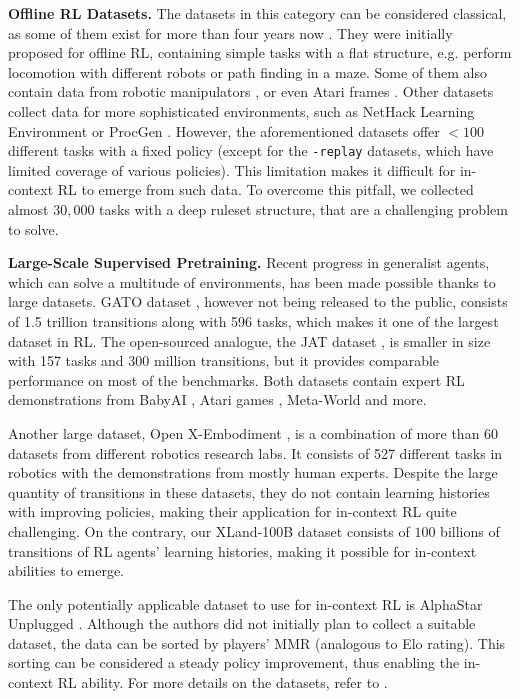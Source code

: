 \documentclass{article}
\begin{document}
\textbf{Offline RL Datasets.}
The datasets in this category can be considered classical, as some of them exist for more than four years now \citep{fu2020d4rl}. They were initially proposed for offline RL, containing simple tasks with a flat structure, e.g. perform locomotion with different robots \citep{lu2023challenges} or path finding in a maze. Some of them also contain data from robotic manipulators \citep{fu2020d4rl, rafailov2023d5rl}, or even Atari frames \citep{gulcehre2021rl}. Other datasets collect data for more sophisticated environments, such as NetHack Learning Environment \citep{hambro2023dungeons, kurenkov2024katakomba} or ProcGen \citep{cobbe2019procgen, mediratta2024generalization}. However, the aforementioned datasets offer $<100$ different tasks with a fixed policy (except for the \texttt{-replay} datasets, which have limited coverage of various policies). This limitation makes it difficult for in-context RL to emerge from such data. To overcome this pitfall, we collected almost $30,000$ tasks with a deep ruleset structure, that are a challenging problem to solve.

\textbf{Large-Scale Supervised Pretraining.}
Recent progress in generalist agents, which can solve a multitude of environments, has been made possible thanks to large datasets. GATO dataset \citep{reed2022generalist}, however not being released to the public, consists of 1.5 trillion transitions along with 596 tasks, which makes it one of the largest dataset in RL. The open-sourced analogue, the JAT dataset \citep{gallouedec2024jack}, is smaller in size with 157 tasks and 300 million transitions, but it provides comparable performance on most of the benchmarks. Both datasets contain expert RL demonstrations from BabyAI \citep{hui2020babyai}, Atari games \citep{bellemare13arcade}, Meta-World \citep{yu2020meta} and more. 

Another large dataset, Open X-Embodiment \citep{padalkar2023open}, is a combination of more than 60 datasets from different robotics research labs. It consists of 527 different tasks in robotics with the demonstrations from mostly human experts. Despite the large quantity of transitions in these datasets, they do not contain learning histories with improving policies, making their application for in-context RL quite challenging. On the contrary, our XLand-100B dataset consists of $100$ billions of transitions of RL agents' learning histories, making it possible for in-context abilities to emerge.

The only potentially applicable dataset to use for in-context RL is AlphaStar Unplugged \citep{mathieu2023alphastar}. Although the authors did not initially plan to collect a suitable dataset, the data can be sorted by players' MMR (analogous to Elo rating). This sorting can be considered a steady policy improvement, thus enabling the in-context RL ability. For more details on the datasets, refer to .
\end{document}
